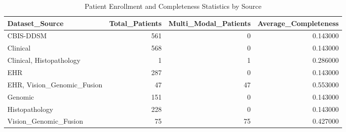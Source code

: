\begin{table}
\caption{Patient Enrollment and Completeness Statistics by Source}
\label{tab:table_patient_statistics}
\begin{tabular}{lrrr}
\toprule
Dataset\_Source & Total\_Patients & Multi\_Modal\_Patients & Average\_Completeness \\
\midrule
CBIS-DDSM & 561 & 0 & 0.143000 \\
Clinical & 568 & 0 & 0.143000 \\
Clinical, Histopathology & 1 & 1 & 0.286000 \\
EHR & 287 & 0 & 0.143000 \\
EHR, Vision\_Genomic\_Fusion & 47 & 47 & 0.553000 \\
Genomic & 151 & 0 & 0.143000 \\
Histopathology & 228 & 0 & 0.143000 \\
Vision\_Genomic\_Fusion & 75 & 75 & 0.427000 \\
\bottomrule
\end{tabular}
\end{table}
